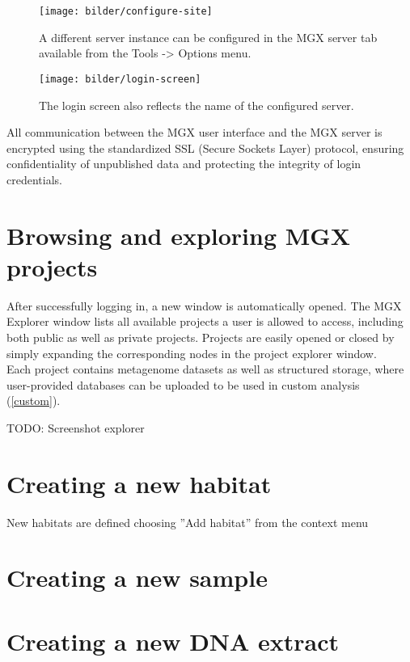 \begin{figure}[ht]
\centering
\texttt{[image: bilder/configure-site]}
\caption[Server configuration:]{A different server instance can be configured in the MGX 
server tab available from the Tools -> Options menu.}
\label{config-site}
\end{figure}


\begin{figure}[ht]
\centering
\texttt{[image: bilder/login-screen]}
\caption[Login screen:]{The login screen also reflects the name of the configured server.}
\label{login-screen}
\end{figure}

All communication between the MGX user interface and the MGX server is encrypted using
the standardized SSL (Secure Sockets Layer) protocol, ensuring confidentiality of 
unpublished data and protecting the integrity of login credentials.


\section{Browsing and exploring MGX projects}

After successfully logging in, a new window is automatically opened. The MGX Explorer window
lists all available projects a user is allowed to access, including both public as well as
private projects. Projects are easily opened or closed by simply expanding the corresponding
nodes in the project explorer window.\\

Each project contains metagenome datasets as well as structured storage, where user-provided
databases can be uploaded to be used in custom analysis (\ref{custom}).

TODO: Screenshot explorer

\section{Creating a new habitat}

New habitats are defined choosing ''Add habitat'' from the context menu 
\section{Creating a new sample}
\section{Creating a new DNA extract}
